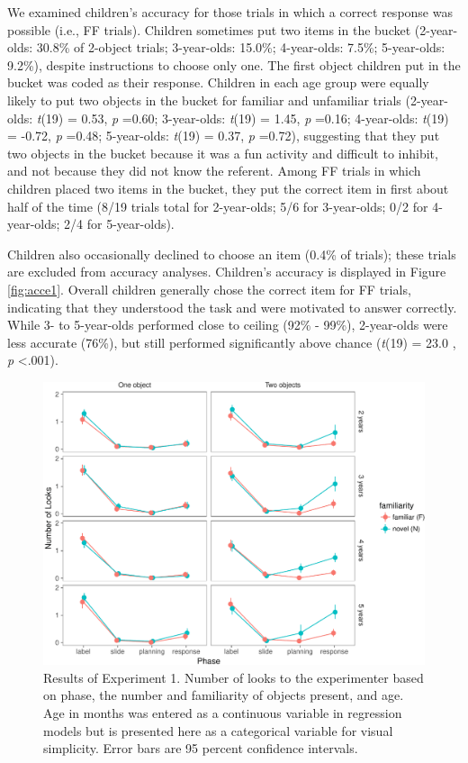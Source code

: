 \documentclass[english,man]{apa6}
\theoremstyle{definition}
\theoremstyle{definition}
\theoremstyle{definition}
\theoremstyle{remark}
\begin{document}
We examined children's accuracy for those trials in which a correct
response was possible (i.e., FF trials). Children sometimes put two
items in the bucket (2-year-olds: 30.8\% of 2-object trials;
3-year-olds: 15.0\%; 4-year-olds: 7.5\%; 5-year-olds: 9.2\%), despite
instructions to choose only one. The first object children put in the
bucket was coded as their response. Children in each age group were
equally likely to put two objects in the bucket for familiar and
unfamiliar trials (2-year-olds: \emph{t}(19) = 0.53, \emph{p} =0.60;
3-year-olds: \emph{t}(19) = 1.45, \emph{p} =0.16; 4-year-olds:
\emph{t}(19) = -0.72, \emph{p} =0.48; 5-year-olds: \emph{t}(19) = 0.37,
\emph{p} =0.72), suggesting that they put two objects in the bucket
because it was a fun activity and difficult to inhibit, and not because
they did not know the referent. Among FF trials in which children placed
two items in the bucket, they put the correct item in first about half
of the time (8/19 trials total for 2-year-olds; 5/6 for 3-year-olds; 0/2
for 4-year-olds; 2/4 for 5-year-olds).

Children also occasionally declined to choose an item (0.4\% of trials);
these trials are excluded from accuracy analyses. Children's accuracy is
displayed in Figure \ref{fig:acce1}. Overall children generally chose
the correct item for FF trials, indicating that they understood the task
and were motivated to answer correctly. While 3- to 5-year-olds
performed close to ceiling (92\% - 99\%), 2-year-olds were less accurate
(76\%), but still performed significantly above chance (\emph{t}(19) =
23.0 , \emph{p} \textless{}.001).

\begin{figure}[htbp]
\centering
\includegraphics{figs/resultse1-1.pdf}
\caption{\label{fig:resultse1}Results of Experiment 1. Number of looks to
the experimenter based on phase, the number and familiarity of objects
present, and age. Age in months was entered as a continuous variable in
regression models but is presented here as a categorical variable for
visual simplicity. Error bars are 95 percent confidence intervals.}
\end{figure}
\end{document}
